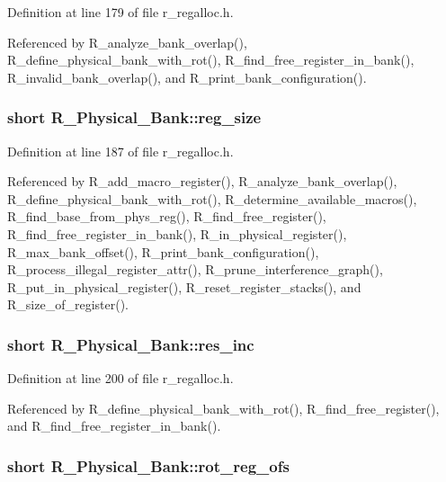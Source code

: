 Definition at line 179 of file r\_\-regalloc.h.

Referenced by R\_\-analyze\_\-bank\_\-overlap(), R\_\-define\_\-physical\_\-bank\_\-with\_\-rot(), R\_\-find\_\-free\_\-register\_\-in\_\-bank(), R\_\-invalid\_\-bank\_\-overlap(), and R\_\-print\_\-bank\_\-configuration().
\subsubsection{\setlength{\rightskip}{0pt plus 5cm}short \bf{R\_\-Physical\_\-Bank::reg\_\-size}}\label{structR__Physical__Bank_6ab7ca70d0a649e998a80cd8d1fa318f}




Definition at line 187 of file r\_\-regalloc.h.

Referenced by R\_\-add\_\-macro\_\-register(), R\_\-analyze\_\-bank\_\-overlap(), R\_\-define\_\-physical\_\-bank\_\-with\_\-rot(), R\_\-determine\_\-available\_\-macros(), R\_\-find\_\-base\_\-from\_\-phys\_\-reg(), R\_\-find\_\-free\_\-register(), R\_\-find\_\-free\_\-register\_\-in\_\-bank(), R\_\-in\_\-physical\_\-register(), R\_\-max\_\-bank\_\-offset(), R\_\-print\_\-bank\_\-configuration(), R\_\-process\_\-illegal\_\-register\_\-attr(), R\_\-prune\_\-interference\_\-graph(), R\_\-put\_\-in\_\-physical\_\-register(), R\_\-reset\_\-register\_\-stacks(), and R\_\-size\_\-of\_\-register().
\subsubsection{\setlength{\rightskip}{0pt plus 5cm}short \bf{R\_\-Physical\_\-Bank::res\_\-inc}}\label{structR__Physical__Bank_aee5da75a1d359572cd65c479c230143}




Definition at line 200 of file r\_\-regalloc.h.

Referenced by R\_\-define\_\-physical\_\-bank\_\-with\_\-rot(), R\_\-find\_\-free\_\-register(), and R\_\-find\_\-free\_\-register\_\-in\_\-bank().
\subsubsection{\setlength{\rightskip}{0pt plus 5cm}short \bf{R\_\-Physical\_\-Bank::rot\_\-reg\_\-ofs}}\label{structR__Physical__Bank_828c0b8ae82a7e380dca07eb3709ebfb}




